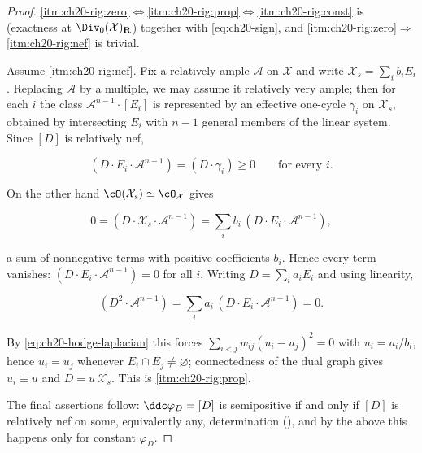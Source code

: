 \begin{proof}
\cref{itm:ch20-rig:zero}\(\Leftrightarrow\)\cref{itm:ch20-rig:prop}\(\Leftrightarrow\)\cref{itm:ch20-rig:const}
is  (exactness at
\(\Div_0(\mathcal X)_{\mathbf R}\)) together with
\eqref{eq:ch20-sign}, and
\cref{itm:ch20-rig:zero}\(\Rightarrow\)\cref{itm:ch20-rig:nef} is trivial.

Assume \cref{itm:ch20-rig:nef}.  Fix a relatively ample \(\mathcal A\) on
\(\mathcal X\) and write \(\mathcal X_s=\sum_ib_iE_i\).  Replacing
\(\mathcal A\) by a multiple, we may assume it relatively very ample; then
for each \(i\) the class \(\mathcal A^{n-1}\cdot[E_i]\) is represented by an
effective one-cycle \(\gamma_i\) on \(\mathcal X_s\), obtained by
intersecting \(E_i\) with \(n-1\) general members of the linear system.
Since \([D]\) is relatively nef,

\begin{equation}
\label{eq:ch20-rigidity-rows}
 (D\cdot E_i\cdot\mathcal A^{n-1})=(D\cdot\gamma_i)\geq0
 \qquad\text{for every }i .
\end{equation}

On the other hand \(\cO(\mathcal X_s)\simeq\cO_{\mathcal X}\) gives

\[
 0=(D\cdot\mathcal X_s\cdot\mathcal A^{n-1})
  =\sum_ib_i\,(D\cdot E_i\cdot\mathcal A^{n-1}),
\]

a sum of nonnegative terms with positive coefficients \(b_i\).  Hence every
term vanishes:
\((D\cdot E_i\cdot\mathcal A^{n-1})=0\) for all \(i\).  Writing
\(D=\sum_ia_iE_i\) and using linearity,

\[
 (D^2\cdot\mathcal A^{n-1})=\sum_ia_i\,(D\cdot E_i\cdot\mathcal A^{n-1})=0 .
\]

By \eqref{eq:ch20-hodge-laplacian} this forces
\(\sum_{i<j}w_{ij}(u_i-u_j)^2=0\) with \(u_i=a_i/b_i\), hence \(u_i=u_j\)
whenever \(E_i\cap E_j\neq\varnothing\); connectedness of the dual graph
gives \(u_i\equiv u\) and \(D=u\,\mathcal X_s\).  This is
\cref{itm:ch20-rig:prop}.

The final assertions follow: \(\ddc\varphi_D=[D]\) is semipositive if and
only if \([D]\) is relatively nef on some, equivalently any, determination
(), and by the above this happens
only for constant \(\varphi_D\).
\end{proof}

